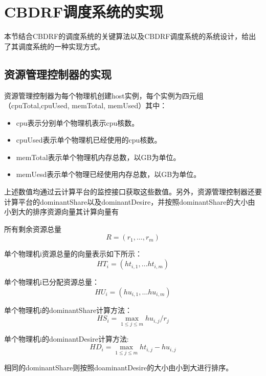 \section{CBDRF调度系统的实现}
本节结合CBDRF的调度系统的关键算法以及CBDRF调度系统的系统设计，给出了其调度系统的一种实现方式。
\subsection{资源管理控制器的实现}
资源管理控制器为每个物理机创建host实例，每个实例为四元组（cpuTotal,cpuUsed, memTotal, memUsed）其中：
\begin{itemize}
\item cpu表示分别单个物理机表示cpu核数。
\item cpuUsed表示单个物理机已经使用的cpu核数。
\item memTotal表示单个物理机内存总数，以GB为单位。
\item memUesd表示单个物理已经使用内存总数，以GB为单位。
\end{itemize}

上述数值均通过云计算平台的监控接口获取这些数值。另外，资源管理控制器还要计算平台的dominantShare以及dominantDesire，并按照dominantShare的大小由小到大的排序资源向量其计算向量有

所有剩余资源总量
\begin{equation}
R=\left({r}_{1},…,{r}_{m}\right)
\end{equation}

单个物理机i资源总量的向量表示如下所示：
\begin{equation}
{HT}_{i}=\left({ht}_{i,1},…{ht}_{i,m} \right)
\end{equation}

单个物理机i已分配资源总量：
\begin{equation}
{HU}_{i}=\left({hu}_{i,1},…{hu}_{i,m}\right)
\end{equation}

单个物理机i的dominantShare计算方法：
\begin{equation}
{HS}_{i} = \max \limits_{1 \leq j \leq m} {hu}_{i,j}/{{r}_{j}} 
\end{equation}

单个物理机i的dominantDesire计算方法:
\begin{equation}
{HD}_{i}=\max \limits_{1 \leq j \leq m } {ht}_{i,j}-{hu}_{i,j} 
\end{equation}

相同的dominantShare则按照doaminantDesire的大小由小到大进行排序。
